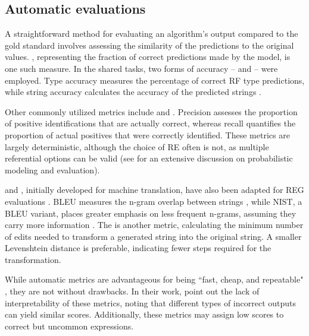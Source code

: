 \subsection{Automatic evaluations}\label{subsec:automaticevaluation}
 
 A straightforward method for evaluating an algorithm’s output compared to the gold standard involves assessing the similarity of the predictions to the original values. , representing the fraction of correct predictions made by the model, is one such measure. In the \grec shared tasks, two forms of accuracy --  and  -- were employed. Type accuracy measures the percentage of correct RF type predictions, while string accuracy calculates the accuracy of the predicted strings \citep{belz2010grec}.

Other commonly utilized metrics include  and . Precision assesses the proportion of positive identifications that are actually correct, whereas recall quantifies the proportion of actual positives that were correctly identified. These metrics are largely deterministic, although the choice of RE often is not, as multiple referential options can be valid (see \citealt{Gompel2019} for an extensive discussion on probabilistic modeling and evaluation).

 and , initially developed for machine translation, have also been adapted for REG evaluations \citep{belz2010grec,belz2008automatic,van2019best, gatt2009introducing}. BLEU measures the n-gram overlap between strings \citep{papineni2002bleu}, while NIST, a BLEU variant, places greater emphasis on less frequent n-grams, assuming they carry more information \citep{comreg2019}. The  is another metric, calculating the minimum number of edits needed to transform a generated string into the original string. A smaller Levenshtein distance is preferable, indicating fewer steps required for the transformation.

While automatic metrics are advantageous for being ``fast, cheap, and repeatable" \citep[555]{reiter2009investigation}, they are not without drawbacks. In their work, \citet{van2019best} point out the lack of interpretability of these metrics, noting that different types of incorrect outputs can yield similar scores. Additionally, these metrics may assign low scores to correct but uncommon expressions.

